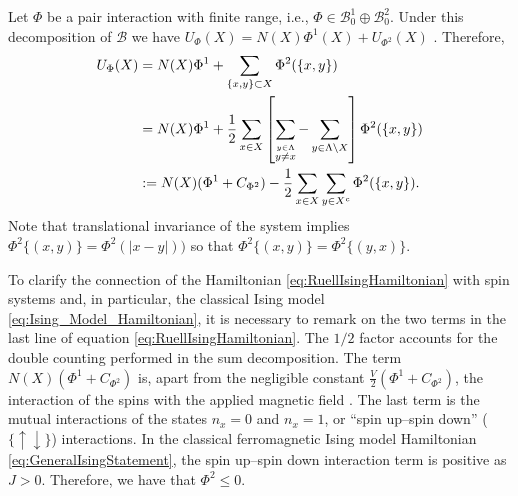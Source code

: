 \documentclass[english,12pt]{ttuthes}
\begin{document}
%
\noindent Let $\Phi$ be a pair interaction with finite range, i.e., 
$\Phi\in\mathscr{B}_0^1\oplus\mathscr{B}_0^2$. Under this decomposition of
$\mathscr{B}$ we have $U_\Phi(X)=N(X)\Phi^1(X)+ U_{\Phi^2}(X)$
\cite{Ruelle-1969}. Therefore, 
%
\begin{align}
  \label{eq:RuellIsingHamiltonian}
  U_\Phi(X)&=N(X)\Phi^1+\sum_{\{x,y\}\subset X}\Phi^2(\{x,y\})\\\notag
       &=N(X)\Phi^1
         +\frac{1}{2}\sum_{x\in X}
         \left[\sum_{\overset{y\in \Lambda}{y\neq x}}-\sum_{y\in\Lambda\backslash X}\right]\Phi^2(\{x,y\})
         \\\notag
       & := N(X)(\Phi^1+C_{\Phi^2})-\frac{1}{2}\sum_{x\in X}\sum_{y\in X^c}\Phi^2(\{x,y\}).        
         \notag
\end{align}
%
Note that translational invariance of the system implies
$\Phi^2\{(x,y)\}=\Phi^2(|x-y|))$ so that $\Phi^2\{(x,y)\}=\Phi^2\{(y,x)\}$. 

To clarify the connection of the Hamiltonian
\eqref{eq:RuellIsingHamiltonian} with spin systems and, in particular,
the classical Ising model \eqref{eq:Ising_Model_Hamiltonian}, it is
necessary to remark on the two terms in the last line of equation
\eqref{eq:RuellIsingHamiltonian}. The $1/2$ factor accounts for the
double counting performed in the sum decomposition. The term
$N(X)(\Phi^1+C_{\Phi^2})$ is, apart from the negligible constant
$\frac{V}{2}(\Phi^1+C_{\Phi^2})$, the interaction of the spins with the
applied magnetic field \cite{Ruelle-1969}. The last term is the mutual
interactions of the states $n_x=0$ and $n_x=1$, or ``spin up--spin
down'' ($\{\uparrow\downarrow\}$) interactions. In the classical ferromagnetic Ising
model Hamiltonian  \eqref{eq:GeneralIsingStatement}, the spin up--spin
down interaction term is positive as $J>0$. Therefore, we have that
$\Phi^2\leq0$.    
\end{document}
